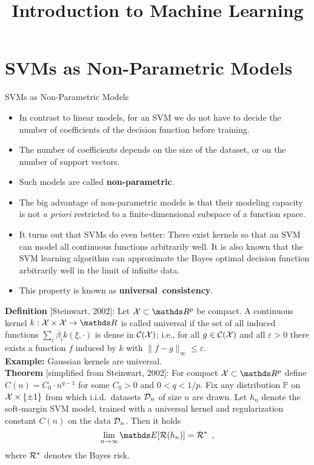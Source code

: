 \documentclass[11pt,compress,t,notes=noshow, xcolor=table]{beamer}
\title{Introduction to Machine Learning}
\date{}
\begin{document}


\section{SVMs as Non-Parametric Models}

\begin{vbframe}{SVMs as Non-Parametric Models}

  \begin{itemize}
    \item In contrast to linear models, for an SVM
    we do not have to decide the number of coefficients of the
    decision function before training.
    \item The number of coefficients depends on the
    size of the dataset, or on the number of support vectors.
    \item Such models are called \textbf{non-parametric}.
    \item The big advantage of non-parametric models is that their
    modeling capacity is not \textit{a priori} restricted
    to a finite-dimensional subspace of a function space.
    \item It turns out that SVMs do even better: There exist kernels so
    that an SVM can model all continuous functions arbitrarily well.
    It is also known that the SVM learning algorithm can approximate the Bayes optimal decision
    function arbitrarily well in the limit of infinite data.
    \item This property is known as \textbf{universal~consistency}.
  \end{itemize}

  \framebreak

  \textbf{Definition} [Steinwart, 2002]:
  Let $\Xspace \subset \R^p$ be compact. A continuous kernel
  $k : \Xspace \times \Xspace \to \R$ is called universal if the set of all
  induced functions $\sum_i \beta_i k\left(\xi, \cdot\right)$ is dense in
  $\mathcal{C}(\mathcal{X})$; i.e., for all $g \in \mathcal{C}(\mathcal{X})$ and all
  $\varepsilon > 0$ there exists a function $f$ induced by $k$ with
  $\|f-g\|_\infty \leq \varepsilon$.\\[1em]

  \textbf{Example:} Gaussian kernels are universal.\\[1em]

  \textbf{Theorem} [simplified from Steinwart, 2002]:
  For compact $\Xspace \subset \R^p$ define $C(n) = C_0 \cdot n^{q - 1}$
  for some $C_0 > 0$ and $0 < q < 1/p$. Fix any distribution $\mathbb{P}$ on
  $\mathcal{X} \times \{\pm 1\}$ from which i.i.d.\ datasets $\mathcal{D}_n$ of size
  $n$ are drawn. Let $h_n$ denote the soft-margin SVM model,
  trained with a universal kernel and regularization constant $C(n)$
  on the data $\mathcal{D}_n$. Then it holds
  $$
    \lim_{n \to \infty} \E[\risk(h_n)] = \risk^*
    \enspace,
  $$
  where $\mathcal{R}^*$ denotes the Bayes risk.

\end{vbframe}
\end{document}
